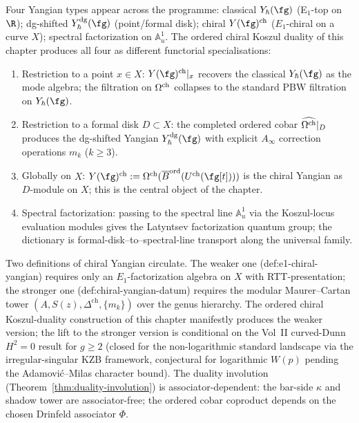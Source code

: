 \begin{convention}
\label{conv:ordered-kd-core-yangian-types}
Four Yangian types appear across the programme: classical
$Y_\hbar(\fg)$ (E$_1$-top on $\R$); dg-shifted
$Y^{\mathrm{dg}}_\hbar(\fg)$ (point/formal disk); chiral
$Y(\fg)^{\mathrm{ch}}$ ($E_1$-chiral on a curve $X$); spectral
factorization on $\mathbb{A}^1_u$. The ordered chiral Koszul
duality of this chapter produces all four as different functorial
specialisations:
\begin{enumerate}[label=\textup{(\arabic*)}]
\item Restriction to a point $x\in X$: $Y(\fg)^{\mathrm{ch}}|_x$
recovers the classical $Y_\hbar(\fg)$ as the mode algebra; the
filtration on $\Omega^{\mathrm{ch}}$ collapses to the standard PBW filtration
on $Y_\hbar(\fg)$.
\item Restriction to a formal disk $D\subset X$: the completed
ordered cobar $\widehat{\Omega^{\mathrm{ch}}}|_D$ produces the dg-shifted
Yangian $Y^{\mathrm{dg}}_\hbar(\fg)$ with explicit $A_\infty$
correction operations $m_k$ ($k\ge 3$).
\item Globally on $X$: $Y(\fg)^{\mathrm{ch}} :=
\Cobar(\Barchord(U^{\mathrm{ch}}(\fg[t])))$ is the chiral
Yangian as $D$-module on $X$; this is the central object of the
chapter.
\item Spectral factorization: passing to the spectral line
$\mathbb{A}^1_u$ via the Koszul-locus evaluation modules gives the
Latyntsev factorization quantum group; the dictionary is
formal-disk--to--spectral-line transport along the universal
family.
\end{enumerate}
\end{convention}

\begin{remark}
\label{rem:ordered-kd-core-two-definitions}
Two definitions of chiral Yangian circulate. The weaker one
(def:e1-chiral-yangian) requires only an $E_1$-factorization
algebra on $X$ with RTT-presentation; the stronger one
(def:chiral-yangian-datum) requires the modular Maurer--Cartan
tower $(A, S(z), \Delta^{\mathrm{ch}}, \{m_k\})$ over the genus
hierarchy. The ordered chiral Koszul-duality construction of this
chapter manifestly produces the weaker version; the lift to the
stronger version is conditional on the Vol~II curved-Dunn $H^2=0$
result for $g\ge 2$ (closed for the non-logarithmic standard
landscape via the irregular-singular KZB framework, conjectural for
logarithmic $W(p)$ pending the Adamovi\'c--Milas character bound).
The duality involution (Theorem~\ref{thm:duality-involution}) is
associator-dependent: the bar-side $\kappa$ and shadow tower are
associator-free; the ordered cobar coproduct depends on the chosen
Drinfeld associator $\Phi$.
\end{remark}

